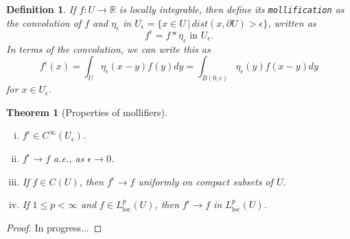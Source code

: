 \documentclass[11pt]{article}
\newtheorem{theorem}{Theorem}
\newtheorem{definition}{Definition}
\theoremstyle{definition}
\begin{document}
\begin{definition}
	If $f : U \rightarrow \mathbb{R}$ is locally integrable, then define its \texttt{mollification} as
	the convolution of $f$ and $\eta_{\epsilon}$ in $U_{\epsilon} = \{x\in U \,|\, dist(x,\partial U) > \epsilon \}$, written as
	\begin{equation*}
		f^{\epsilon} = f * \eta_{\epsilon} \text{ in } U_{\epsilon}.
	\end{equation*}
	In terms of the convolution, we can write this as
	\begin{equation*}
		f^{\epsilon}(x) = \int_U \eta_{\epsilon}(x-y)f(y)dy = \int_{B(0,\epsilon)} \eta_{\epsilon}(y)f(x-y)dy
	\end{equation*}
	for $x \in U_{\epsilon}$.
\end{definition}
\begin{theorem}[Properties of mollifiers]~ 
	\begin{enumerate}[(i)]
		\item $f^{\epsilon} \in C^{\infty}(U_{\epsilon})$.
		\item $f^{\epsilon} \rightarrow f$ a.e., as $\epsilon \rightarrow 0$.
		\item If $f \in C(U)$, then $f^{\epsilon} \rightarrow f$ uniformly on compact subsets of $U$.
		\item If $1\leq p < \infty$ and $f \in L_{\text{loc}}^p(U)$, then $f^{\epsilon} \rightarrow f$ in $L_{\text{loc}}^p(U)$.
	\end{enumerate}
\end{theorem}
\begin{proof}
	In progress...
\end{proof}

\newpage
\end{document}
